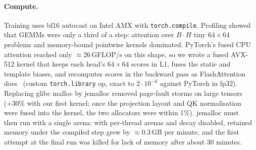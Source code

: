 \paragraph{Compute.} Training uses bf16 autocast on Intel AMX with \texttt{torch.compile}. Profiling
showed that GEMMs were only a third of a step: attention over $B\cdot H$ tiny $64\times64$ problems
and memory-bound pointwise kernels dominated. PyTorch's fused CPU attention reached only
$\approx$26\,GFLOP/s on this shape, so we wrote a fused AVX-512 kernel that keeps each head's
$64\times64$ scores in L1, fuses the static and template biases, and recomputes scores in the
backward pass as FlashAttention does~\cite{flash} (custom \texttt{torch.library} op, exact to $2\cdot10^{-6}$ against PyTorch in fp32).
Replacing glibc malloc by jemalloc removed page-fault storms on large tensors (+30\% with our first
kernel; once the projection layout and QK normalisation were fused into the kernel, the two allocators
were within 1\%). jemalloc must then run with a single arena: with per-thread arenas and decay
disabled, retained memory under the compiled step grew by $\approx$0.3\,GB per minute, and the first
attempt at the final run was killed for lack of memory after about 30 minutes.


